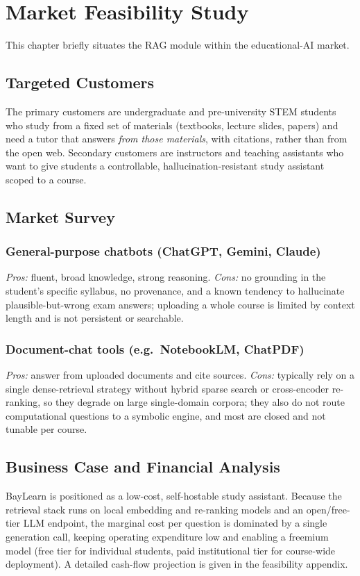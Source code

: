 \documentclass[12pt,a4paper]{report}
\begin{document}
\chapter{Market Feasibility Study}
This chapter briefly situates the RAG module within the educational-AI market.

\section{Targeted Customers}
The primary customers are undergraduate and pre-university STEM students who study
from a fixed set of materials (textbooks, lecture slides, papers) and need a tutor
that answers \emph{from those materials}, with citations, rather than from the open
web. Secondary customers are instructors and teaching assistants who want to give
students a controllable, hallucination-resistant study assistant scoped to a course.

\section{Market Survey}
\subsection{General-purpose chatbots (ChatGPT, Gemini, Claude)}
\emph{Pros:} fluent, broad knowledge, strong reasoning. \emph{Cons:} no grounding
in the student's specific syllabus, no provenance, and a known tendency to
hallucinate plausible-but-wrong exam answers; uploading a whole course is limited
by context length and is not persistent or searchable.

\subsection{Document-chat tools (e.g.\ NotebookLM, ChatPDF)}
\emph{Pros:} answer from uploaded documents and cite sources. \emph{Cons:}
typically rely on a single dense-retrieval strategy without hybrid sparse search
or cross-encoder re-ranking, so they degrade on large single-domain corpora; they
also do not route computational questions to a symbolic engine, and most are
closed and not tunable per course.

\section{Business Case and Financial Analysis}
BayLearn is positioned as a low-cost, self-hostable study assistant. Because the
retrieval stack runs on local embedding and re-ranking models and an
open/free-tier LLM endpoint, the marginal cost per question is dominated by a
single generation call, keeping operating expenditure low and enabling a freemium
model (free tier for individual students, paid institutional tier for course-wide
deployment). A detailed cash-flow projection is given in the feasibility appendix.
\end{document}

